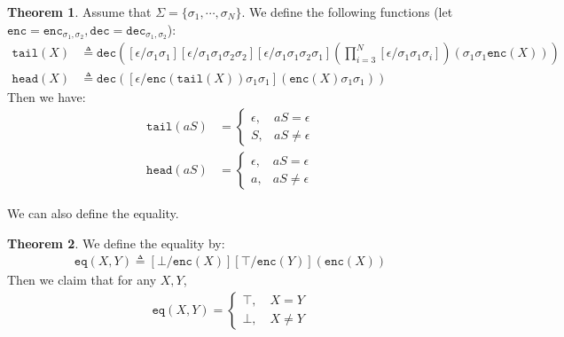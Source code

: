 \documentclass{article}
\theoremstyle{definition}
\newtheorem{theorem}{Theorem}[section]
\begin{document}
\begin{theorem}
    Assume that $\Sigma = \{\sigma_1,\cdots,\sigma_N\}$.
    We define the following functions (let $\mathtt{enc}=\mathtt{enc}_{\sigma_1,\sigma_2},\mathtt{dec}=\mathtt{dec}_{\sigma_1,\sigma_2}$):
    \begin{align}
        \mathtt{tail}(X) & \triangleq \mathtt{dec}\left([\epsilon/\sigma_1\sigma_1][\epsilon/\sigma_1\sigma_1\sigma_2\sigma_2][\epsilon/\sigma_1\sigma_1\sigma_2\sigma_1](\prod_{i=3}^N[\epsilon/\sigma_1\sigma_1\sigma_i]) (\sigma_1\sigma_1\mathtt{enc}(X))\right) \\
        \mathtt{head}(X) & \triangleq \mathtt{dec}([\epsilon/\mathtt{enc}(\mathtt{tail}(X))\sigma_1\sigma_1](\mathtt{enc}(X)\sigma_1\sigma_1))
    \end{align}
    Then we have:
    \begin{align}
        \mathtt{tail}(aS) & = \begin{cases}
                                  \epsilon, & aS=\epsilon     \\
                                  S,        & aS\neq \epsilon
                              \end{cases} \\
        \mathtt{head}(aS) & = \begin{cases}
                                  \epsilon, & aS=\epsilon     \\
                                  a,        & aS\neq \epsilon
                              \end{cases}
    \end{align}
\end{theorem}

We can also define the equality.

\begin{theorem}
    We define the equality by:
    \begin{align}
        \mathtt{eq}(X,Y) \triangleq [\bot/\mathtt{enc}(X)][\top/\mathtt{enc}(Y)](\mathtt{enc}(X))
    \end{align}
    Then we claim that for any $X,Y$,
    \begin{align}
        \mathtt{eq}(X,Y) = \begin{cases}
                               \top,\quad X=Y \\
                               \bot,\quad X\neq Y
                           \end{cases}
    \end{align}
\end{theorem}
\end{document}
